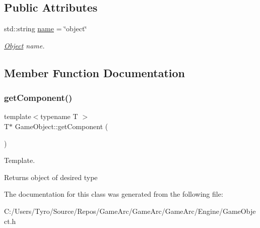 \subsection*{Public Attributes}
\begin{DoxyCompactItemize}
\item 
\mbox{\label{class_game_object_af542b33c8de269343e22c5629e6b66c0}} 
std\+::string \mbox{\hyperlink{class_game_object_af542b33c8de269343e22c5629e6b66c0}{name}} = \char`\"{}object\char`\"{}
\begin{DoxyCompactList}\small\item\em \mbox{\hyperlink{class_object}{Object}} name. \end{DoxyCompactList}\end{DoxyCompactItemize}


\subsection{Member Function Documentation}
\mbox{\label{class_game_object_a1c50376c7f24439359a3962f57dfd513}} 
\subsubsection{\texorpdfstring{getComponent()}{getComponent()}}
{\footnotesize\ttfamily template$<$typename T $>$ \\
T$\ast$ Game\+Object\+::get\+Component (\begin{DoxyParamCaption}{ }\end{DoxyParamCaption})\hspace{0.3cm}{\ttfamily [inline]}}



Template. 

Returns object of desired type 

The documentation for this class was generated from the following file\+:\begin{DoxyCompactItemize}
\item 
C\+:/\+Users/\+Tyro/\+Source/\+Repos/\+Game\+Arc/\+Game\+Arc/\+Game\+Arc/\+Engine/Game\+Object.\+h\end{DoxyCompactItemize}
